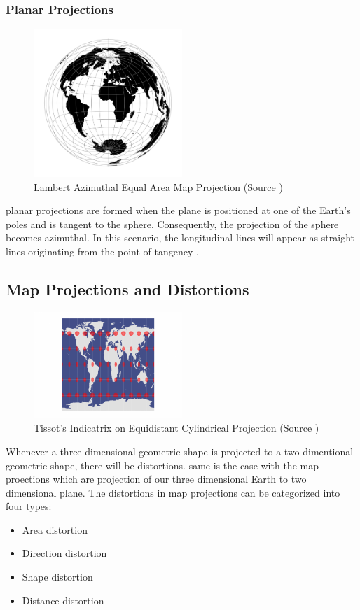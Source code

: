 \subsubsection{Planar Projections}

\begin{figure}[h]
    \centering
    \includegraphics[width=0.5\textwidth]{figures/chapter-3/laea.png}
    \caption{Lambert Azimuthal Equal Area Map Projection (Source \cite{PROJ_SITE})}
    \label{fig:vitkovsky-image}
\end{figure}

planar projections are formed when the plane is positioned at one of the Earth's poles and is tangent to the sphere. Consequently, the projection of the sphere becomes azimuthal. In this scenario, the longitudinal lines will appear as straight lines originating from the point of tangency \cite{Snyder1982}.


\subsection{Map Projections and Distortions}
\begin{figure}[h]
    \centering
    \includegraphics[width=0.5\textwidth]{figures/chapter-3/Tissot-Equidistant-Cylindrical-1-678x486.png}
    \caption{Tissot's Indicatrix on Equidistant Cylindrical Projection (Source \cite{GISGEO_Tissot})}
    \label{fig:tissot-image}
\end{figure}
Whenever a three dimensional geometric shape is projected to a two dimentional geometric shape, there will be distortions. same is the case with the map proections which are projection of our three dimensional Earth to two dimensional plane.
The distortions in map projections can be categorized into four types:
\begin{itemize}
    \item Area distortion
    \item Direction distortion
    \item Shape distortion
    \item Distance distortion
\end{itemize}

